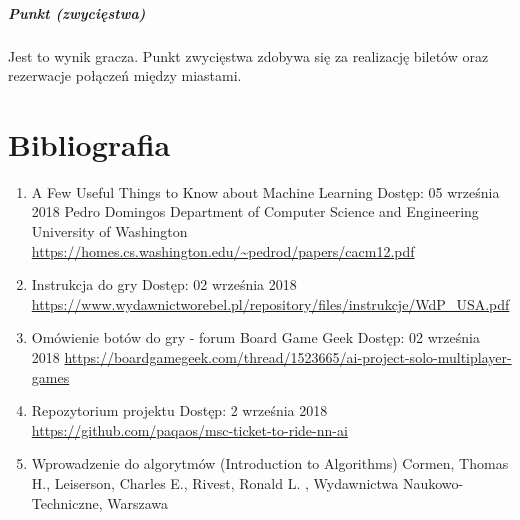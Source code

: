 \documentclass[12pt, oneside]{report}
\begin{document}
\paragraph{Punkt (zwycięstwa)} Jest to wynik gracza. Punkt zwycięstwa zdobywa się za realizację biletów oraz rezerwacje połączeń między miastami.
\chapter{Bibliografia}
\begin{enumerate}
	\item{A Few Useful Things to Know about Machine Learning
	}
	\subitem Dostęp: 05 września 2018
	\subitem Pedro Domingos
	\subitem Department of Computer Science and Engineering
	\subitem University of Washington
	\subitem \url{https://homes.cs.washington.edu/~pedrod/papers/cacm12.pdf}

	\item{Instrukcja do gry}
	\subitem Dostęp: 02 września 2018
	\subitem \url{https://www.wydawnictworebel.pl/repository/files/instrukcje/WdP_USA.pdf}
	
	\item{Omówienie botów do gry - forum Board Game Geek}
	\subitem Dostęp: 02 września 2018
	\subitem \url{https://boardgamegeek.com/thread/1523665/ai-project-solo-multiplayer-games}
	\item{Repozytorium projektu}
	\subitem Dostęp: 2 września 2018
	\subitem \url{https://github.com/paqaos/msc-ticket-to-ride-nn-ai}
	\item{Wprowadzenie do algorytmów (Introduction to Algorithms)}
	\subitem Cormen, Thomas H., Leiserson, Charles E., Rivest, Ronald L.
	, Wydawnictwa Naukowo-Techniczne, Warszawa
\end{enumerate}
\listoffigures
\listoftables
\end{document}
